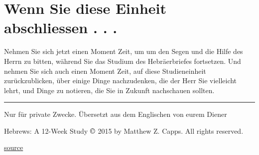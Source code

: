 \documentclass[]{krantz}
\begin{document}
\section{Wenn Sie diese Einheit abschliessen . .
.}\label{wenn-sie-diese-einheit-abschliessen-.-.-.-5}

Nehmen Sie sich jetzt einen Moment Zeit, um um den Segen und die Hilfe
des Herrn zu bitten, während Sie das Studium des Hebräerbriefes
fortsetzen. Und nehmen Sie sich auch einen Moment Zeit, auf diese
Studieneinheit zurückzublicken, über einige Dinge nachzudenken, die der
Herr Sie vielleicht lehrt, und Dinge zu notieren, die Sie in Zukunft
nachschauen sollten.

\begin{center}\rule{0.5\linewidth}{0.5pt}\end{center}

Nur für private Zwecke. Übersetzt aus dem Englischen von eurem Diener

Hebrews: A 12-Week Study \(\copyright\) 2015 by Matthew Z. Capps. All
rights reserved.

\href{https://www.thegospelcoalition.org/course/knowing-bible-hebrews/\#week-7-jesus-is-the-superior-high-priest-part-2-heb-71-813}{source}


\end{document}
